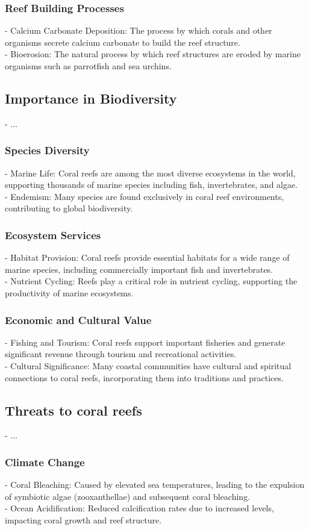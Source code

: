 \subsubsection{Reef Building Processes}
- Calcium Carbonate Deposition: The process by which corals and other organisms secrete calcium carbonate to build the reef structure. \\
- Bioerosion: The natural process by which reef structures are eroded by marine organisms such as parrotfish and sea urchins.

\subsection{Importance in Biodiversity}
- ... 
\subsubsection{Species Diversity}
- Marine Life: Coral reefs are among the most diverse ecosystems in the world, supporting thousands of marine species including fish, invertebrates, and algae. \\
- Endemism: Many species are found exclusively in coral reef environments, contributing to global biodiversity.
\subsubsection{Ecosystem Services}
- Habitat Provision: Coral reefs provide essential habitats for a wide range of marine species, including commercially important fish and invertebrates. \\
- Nutrient Cycling: Reefs play a critical role in nutrient cycling, supporting the productivity of marine ecosystems. 
\subsubsection{Economic and Cultural Value}
- Fishing and Tourism: Coral reefs support important fisheries and generate significant revenue through tourism and recreational activities. \\
- Cultural Significance: Many coastal communities have cultural and spiritual connections to coral reefs, incorporating them into traditions and practices.

\subsection{Threats to coral reefs}
- ... 
\subsubsection{Climate Change}
- Coral Bleaching: Caused by elevated sea temperatures, leading to the expulsion of symbiotic algae (zooxanthellae) and subsequent coral bleaching. \\
- Ocean Acidification: Reduced calcification rates due to increased  levels, impacting coral growth and reef structure.

